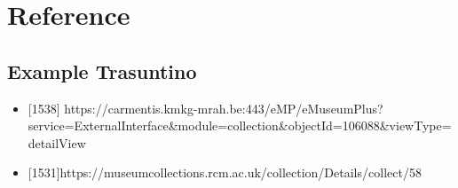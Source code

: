 \section{Reference}\label{reference}

\subsection{Example Trasuntino}\label{example-trasuntino}

\begin{itemize}
\tightlist
\item
  {[}1538{]}
  https://carmentis.kmkg-mrah.be:443/eMP/eMuseumPlus?service=ExternalInterface\&module=collection\&objectId=106088\&viewType=detailView
\item
  {[}1531{]}https://museumcollections.rcm.ac.uk/collection/Details/collect/58
\end{itemize}

